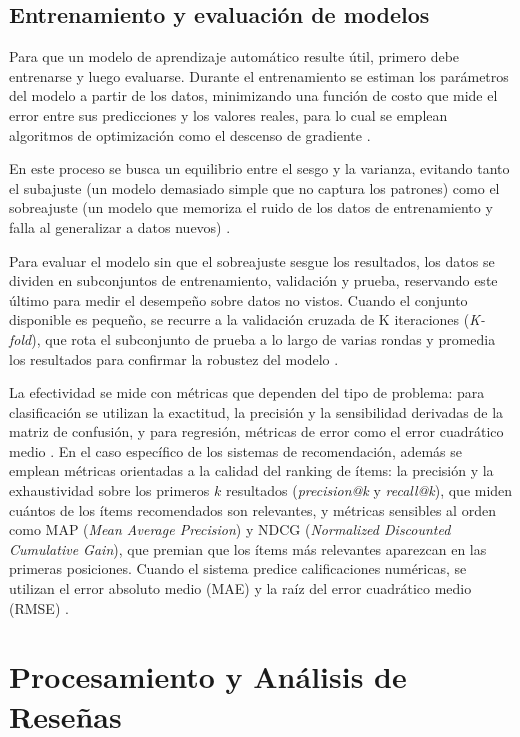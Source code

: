\subsection{Entrenamiento y evaluación de modelos}\label{subsec:entrenamiento_evaluacion}

Para que un modelo de aprendizaje automático resulte útil, primero debe entrenarse y luego evaluarse. Durante el entrenamiento se estiman los parámetros del modelo a partir de los datos, minimizando una función de costo que mide el error entre sus predicciones y los valores reales, para lo cual se emplean algoritmos de optimización como el descenso de gradiente \parencite{BadilloEtAl2020}.

En este proceso se busca un equilibrio entre el sesgo y la varianza, evitando tanto el subajuste (un modelo demasiado simple que no captura los patrones) como el sobreajuste (un modelo que memoriza el ruido de los datos de entrenamiento y falla al generalizar a datos nuevos) \parencite{BadilloEtAl2020}.

Para evaluar el modelo sin que el sobreajuste sesgue los resultados, los datos se dividen en subconjuntos de entrenamiento, validación y prueba, reservando este último para medir el desempeño sobre datos no vistos. Cuando el conjunto disponible es pequeño, se recurre a la validación cruzada de K iteraciones (\emph{K-fold}), que rota el subconjunto de prueba a lo largo de varias rondas y promedia los resultados para confirmar la robustez del modelo \parencite{BadilloEtAl2020}.

La efectividad se mide con métricas que dependen del tipo de problema: para clasificación se utilizan la exactitud, la precisión y la sensibilidad derivadas de la matriz de confusión, y para regresión, métricas de error como el error cuadrático medio \parencite{BadilloEtAl2020}. En el caso específico de los sistemas de recomendación, además se emplean métricas orientadas a la calidad del ranking de ítems: la precisión y la exhaustividad sobre los primeros $k$ resultados (\emph{precision@k} y \emph{recall@k}), que miden cuántos de los ítems recomendados son relevantes, y métricas sensibles al orden como MAP (\emph{Mean Average Precision}) y NDCG (\emph{Normalized Discounted Cumulative Gain}), que premian que los ítems más relevantes aparezcan en las primeras posiciones. Cuando el sistema predice calificaciones numéricas, se utilizan el error absoluto medio (MAE) y la raíz del error cuadrático medio (RMSE) \parencite{KoEtAl2022}.

\section{Procesamiento y Análisis de Reseñas}\label{sec:procesamiento_resenas}

